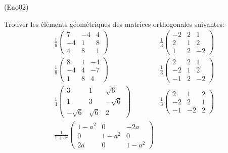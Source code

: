 \begin{tiny}(Eao02)\end{tiny}
 Trouver les éléments géométriques des matrices orthogonales suivantes:
\begin{align*}
&\frac{1}{9}\begin{pmatrix}
7 & -4 & 4 \\ 
-4 & 1 & 8 \\ 
4 & 8 & 1
\end{pmatrix} 
&\frac{1}{3}\begin{pmatrix}
-2 & 2 & 1 \\ 
2 & 1 & 2 \\ 
1 & 2 & -2
\end{pmatrix}\\
&\frac{1}{9}\begin{pmatrix}
8 & 1 & -4 \\ 
-4 & 4 & -7 \\ 
1 & 8 & 4
\end{pmatrix} 
&\frac{1}{3}\begin{pmatrix}
2 & 2 & 1 \\ 
-2 & 1 & 2 \\ 
-1 & 2 & -2
\end{pmatrix}\\  
&\frac{1}{4}\begin{pmatrix}
3 & 1 & \sqrt{6} \\ 
1 & 3 &  -\sqrt{6}\\ 
-\sqrt{6} & \sqrt{6} & 2
\end{pmatrix} 
&\frac{1}{3}
\begin{pmatrix}
2&1&2\\-2&2&1\\-1&-2&2 
\end{pmatrix} \\
&\frac{1}{1+a^2}
\begin{pmatrix}
 1-a^2 & 0 & -2a \\ 0 & 1-a^2 & 0 \\ 2a & 0 & 1-a^2
\end{pmatrix} &
\end{align*}